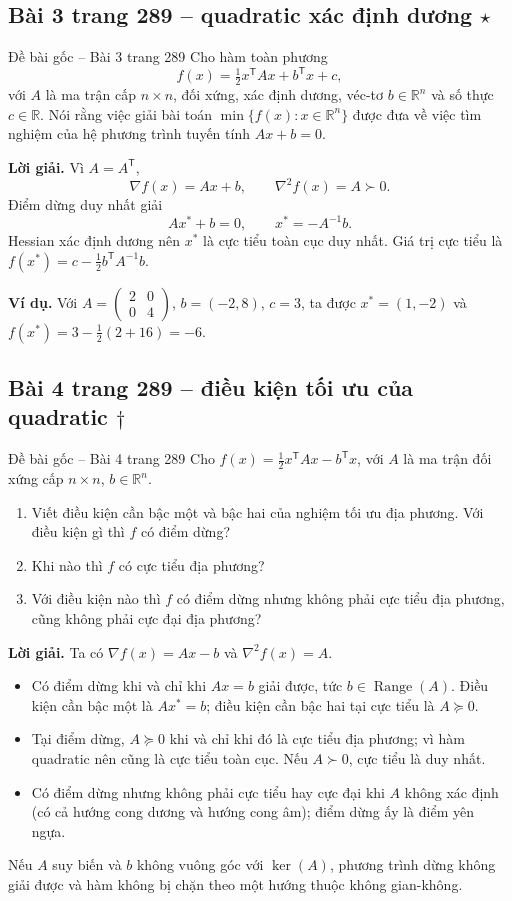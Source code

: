 \documentclass[11pt,a4paper]{article}
\newcommand{\R}{\mathbb{R}}
\newcommand{\grad}{\nabla}
\newcommand{\Hess}{\nabla^2}
\newcommand{\T}{^{\mathsf T}}
\begin{document}
\clearpage
\subsection{Bài 3 trang 289 -- quadratic xác định dương \(\star\)}
\begin{questionbox}{Đề bài gốc -- Bài 3 trang 289}
Cho hàm toàn phương
\[
f(x)=\tfrac12x\T Ax+b\T x+c,
\]
với \(A\) là ma trận cấp \(n\times n\), đối xứng, xác định dương, véc-tơ \(b\in\R^n\) và số thực \(c\in\R\). Nói rằng việc giải bài toán \(\min\{f(x):x\in\R^n\}\) được đưa về việc tìm nghiệm của hệ phương trình tuyến tính \(Ax+b=0\).
\end{questionbox}
\textbf{Lời giải.} Vì \(A=A\T\),
\[
\grad f(x)=Ax+b,\qquad \Hess f(x)=A\succ0.
\]
Điểm dừng duy nhất giải
\[
Ax^\ast+b=0,\qquad x^\ast=-A^{-1}b.
\]
Hessian xác định dương nên \(x^\ast\) là cực tiểu toàn cục duy nhất. Giá trị cực tiểu là \(f(x^\ast)=c-\tfrac12b\T A^{-1}b\).

\textbf{Ví dụ.} Với \(A=\begin{pmatrix}2&0\\0&4\end{pmatrix}\), \(b=(-2,8)\), \(c=3\), ta được \(x^\ast=(1,-2)\) và \(f(x^\ast)=3-\tfrac12(2+16)=-6\).

\clearpage
\subsection{Bài 4 trang 289 -- điều kiện tối ưu của quadratic \(\dagger\)}
\begin{questionbox}{Đề bài gốc -- Bài 4 trang 289}
Cho \(f(x)=\tfrac12x\T Ax-b\T x\), với \(A\) là ma trận đối xứng cấp \(n\times n\), \(b\in\R^n\).
\begin{enumerate}[label=\roman*),nosep,leftmargin=*]
\item Viết điều kiện cần bậc một và bậc hai của nghiệm tối ưu địa phương. Với điều kiện gì thì \(f\) có điểm dừng?
\item Khi nào thì \(f\) có cực tiểu địa phương?
\item Với điều kiện nào thì \(f\) có điểm dừng nhưng không phải cực tiểu địa phương, cũng không phải cực đại địa phương?
\end{enumerate}
\end{questionbox}
\textbf{Lời giải.} Ta có \(\grad f(x)=Ax-b\) và \(\Hess f(x)=A\).
\begin{itemize}
\item Có điểm dừng khi và chỉ khi \(Ax=b\) giải được, tức \(b\in\operatorname{Range}(A)\). Điều kiện cần bậc một là \(Ax^\ast=b\); điều kiện cần bậc hai tại cực tiểu là \(A\succeq0\).
\item Tại điểm dừng, \(A\succeq0\) khi và chỉ khi đó là cực tiểu địa phương; vì hàm quadratic nên cũng là cực tiểu toàn cục. Nếu \(A\succ0\), cực tiểu là duy nhất.
\item Có điểm dừng nhưng không phải cực tiểu hay cực đại khi \(A\) không xác định (có cả hướng cong dương và hướng cong âm); điểm dừng ấy là điểm yên ngựa.
\end{itemize}
Nếu \(A\) suy biến và \(b\) không vuông góc với \(\ker(A)\), phương trình dừng không giải được và hàm không bị chặn theo một hướng thuộc không gian-không.
\end{document}
